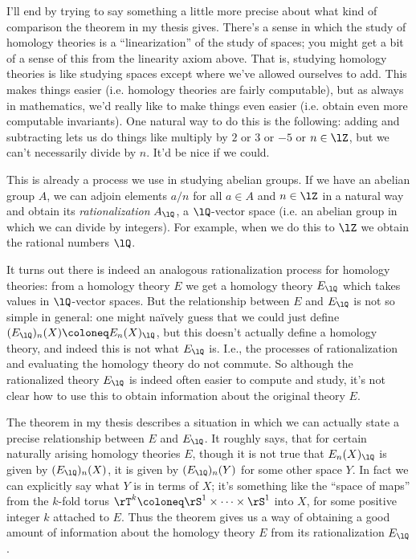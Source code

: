 \begin{nothing}[Rationalizing]
  I'll end by trying to say something a little more precise about what
  kind of comparison the theorem in my thesis gives. There's a sense
  in which the study of homology theories is a ``linearization'' of
  the study of spaces; you might get a bit of a sense of this from the
  linearity axiom above. That is, studying homology theories is like
  studying spaces except where we've allowed ourselves to add. This
  makes things easier (i.e. homology theories are fairly computable),
  but as always in mathematics, we'd really like to make things even
  easier (i.e. obtain even more computable invariants). One natural
  way to do this is the following: adding and subtracting lets us do
  things like multiply by $2$ or $3$ or $-5$ or $n \in \lZ$, but we
  can't necessarily divide by $n$. It'd be nice if we could.

  This is already a process we use in studying abelian groups. If we
  have an abelian group $A$, we can adjoin elements $a/n$ for all
  $a \in A$ and $n \in \lZ$ in a natural way and obtain its
  \emph{rationalization} $A_\lQ$, a $\lQ$-vector space (i.e. an
  abelian group in which we can divide by integers). For example, when
  we do this to $\lZ$ we obtain the rational numbers $\lQ$.

  It turns out there is indeed an analogous rationalization process
  for homology theories: from a homology theory $E$ we get a homology
  theory $E_\lQ$ which takes values in $\lQ$-vector spaces. But the
  relationship between $E$ and $E_\lQ$ is not so simple in general:
  one might na\"ively guess that we could just define
  $(E_\lQ)_n(X) \ce E_n(X)_\lQ$, but this doesn't actually define a
  homology theory, and indeed this is not what $E_\lQ$ is. I.e., the
  processes of rationalization and evaluating the homology theory do
  not commute. So although the rationalized theory $E_\lQ$ is indeed
  often easier to compute and study, it's not clear how to use this to
  obtain information about the original theory $E$.

  The theorem in my thesis describes a situation in which we can
  actually state a precise relationship between $E$ and $E_\lQ$. It
  roughly says, that for certain naturally arising homology theories
  $E$, though it is not true that $E_n(X)_\lQ$ is given by
  $(E_\lQ)_n(X)$, it is given by $(E_\lQ)_n(Y)$ for some other space
  $Y$. In fact we can explicitly say what $Y$ is in terms of $X$; it's
  something like the ``space of maps'' from the $k$-fold torus
  $\rT^k \ce \rS^1 \times \cdots \times \rS^1$ into $X$, for some
  positive integer $k$ attached to $E$. Thus the theorem gives us a
  way of obtaining a good amount of information about the homology
  theory $E$ from its rationalization $E_\lQ$.
\end{nothing}




% 
% 



